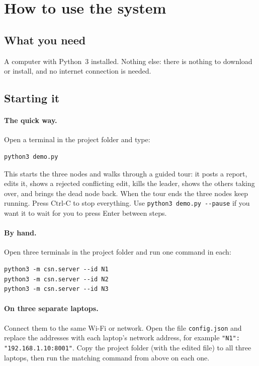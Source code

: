 \documentclass[11pt,a4paper]{article}
\begin{document}
\section{How to use the system}

\subsection{What you need}

A computer with Python~3 installed. Nothing else: there is nothing to download or install, and no
internet connection is needed.

\subsection{Starting it}

\paragraph{The quick way.} Open a terminal in the project folder and type:
\begin{verbatim}
python3 demo.py
\end{verbatim}
This starts the three nodes and walks through a guided tour: it posts a report, edits it, shows a
rejected conflicting edit, kills the leader, shows the others taking over, and brings the dead
node back. When the tour ends the three nodes keep running. Press Ctrl-C to stop everything. Use
\texttt{python3 demo.py -{}-pause} if you want it to wait for you to press Enter between steps.

\paragraph{By hand.} Open three terminals in the project folder and run one command in each:
\begin{verbatim}
python3 -m csn.server --id N1
python3 -m csn.server --id N2
python3 -m csn.server --id N3
\end{verbatim}

\paragraph{On three separate laptops.} Connect them to the same Wi-Fi or network. Open the file
\texttt{config.json} and replace the addresses with each laptop's network address, for example
\texttt{"N1": "192.168.1.10:8001"}. Copy the project folder (with the edited file) to all three
laptops, then run the matching command from above on each one.
\end{document}
